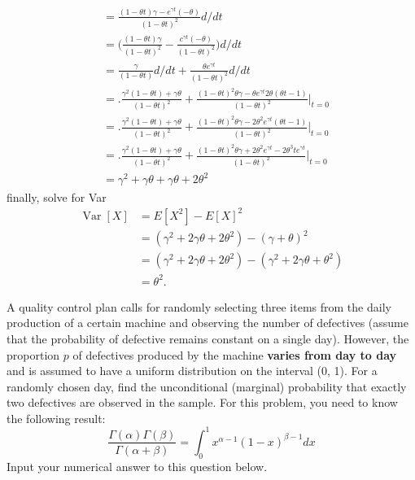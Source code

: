 \documentclass[answers]{exam}
\begin{document}
\begin{questions}
\begin{solution}
\begin{align*}
		&= \frac{(1-\theta t)\gamma-e^{\gamma t}(-\theta)}{(1-\theta t)^2} d/dt \\
		&= \bigg( \frac{(1-\theta t)\gamma}{(1-\theta t)^2} - \frac{c^{\gamma t}(-\theta)}{(1-\theta t)^2} \bigg) d/dt \\
		&= \frac{\gamma}{(1-\theta t)}d/dt + \frac{\theta e^{\gamma t}}{(1-\theta t)^2} d/dt \\
		&= \bigg. \frac{\gamma^2(1-\theta t)+\gamma\theta}{(1-\theta t)^2} + 
			\frac{(1-\theta t)^2\theta\gamma -
				\theta e^{\gamma t}2\theta(\theta t-1)   }{(1-\theta t)^2} \bigg|_{t=0} \\
		&= \bigg. \frac{\gamma^2(1-\theta t)+\gamma\theta}{(1-\theta t)^2} + 
			\frac{(1-\theta t)^2\theta\gamma -
				2\theta^2 e^{\gamma t}(\theta t-1)   }{(1-\theta t)^2} \bigg|_{t=0} \\
		&= \bigg. \frac{\gamma^2(1-\theta t)+\gamma\theta}{(1-\theta t)^2} + 
		\frac{(1-\theta t)^2\theta\gamma +
			2\theta^2 e^{\gamma t}-2\theta^3 te^{\gamma t}   }{(1-\theta t)^2} \bigg|_{t=0} \\
		&= \gamma^2 +\gamma\theta + \gamma\theta + 2\theta^2
	\end{align*}
	finally, solve for Var
	\begin{align*}
		\operatorname{Var}[X]
		&= E[X^2] - E[X]^2 \\
		&= (\gamma^2 + 2\gamma\theta +2\theta^2)-(\gamma+\theta)^2 \\
		&= (\gamma^2 + 2\gamma\theta +2\theta^2)-(\gamma^2+2\gamma\theta+\theta^2) \\
		&= \theta^2.
	\end{align*}
\end{solution}
	
\question 
A quality control plan calls for randomly selecting three items from the daily production of a certain machine and observing the number of defectives (assume that the probability of defective remains constant on a single day). However, the proportion $p$ of defectives produced by the machine \textbf{varies from day to day} and is assumed to have a uniform distribution on the interval (0, 1). For a randomly chosen day, find the unconditional (marginal) probability that exactly two defectives are observed in the sample.
For this problem, you need to know the following result:
\[ \frac{\Gamma(\alpha)\Gamma(\beta)}{\Gamma(\alpha+\beta)} = \int_{0}^{1}x^{\alpha-1}(1-x)^{\beta-1}dx \]
Input your numerical answer to this question below.
\begin{solution}
	
\end{solution}

\end{questions}
\end{document}
